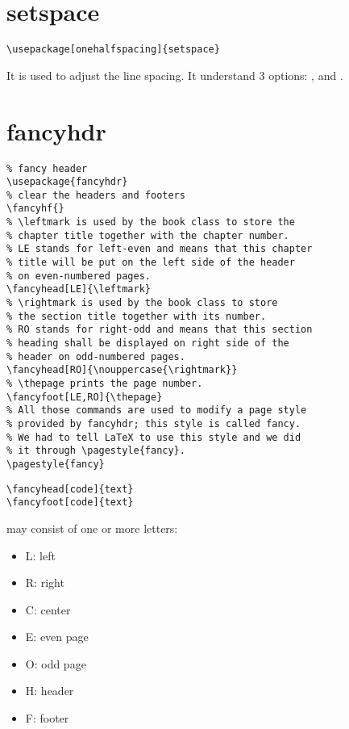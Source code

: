 \section{setspace}
\label{sec:setspace}
\begin{lstlisting}
\usepackage[onehalfspacing]{setspace}
\end{lstlisting}

It is used to adjust the line spacing.
It understand 3 options: ,  and .



\section{fancyhdr}
\label{sec:fancyhdr}
\begin{lstlisting}
% fancy header
\usepackage{fancyhdr}           
% clear the headers and footers
\fancyhf{}                      
% \leftmark is used by the book class to store the
% chapter title together with the chapter number. 
% LE stands for left-even and means that this chapter
% title will be put on the left side of the header
% on even-numbered pages.
\fancyhead[LE]{\leftmark}       
% \rightmark is used by the book class to store
% the section title together with its number. 
% RO stands for right-odd and means that this section
% heading shall be displayed on right side of the
% header on odd-numbered pages.
\fancyhead[RO]{\nouppercase{\rightmark}} 
% \thepage prints the page number.
\fancyfoot[LE,RO]{\thepage}     
% All those commands are used to modify a page style
% provided by fancyhdr; this style is called fancy.
% We had to tell LaTeX to use this style and we did
% it through \pagestyle{fancy}.
\pagestyle{fancy}
\end{lstlisting}


\begin{lstlisting}
\fancyhead[code]{text}
\fancyfoot[code]{text}
\end{lstlisting}

 may consist of one or more letters:
\begin{itemize}
\item L: left
\item R: right
\item C: center
\item E: even page
\item O: odd page
\item H: header
\item F: footer
\end{itemize}


